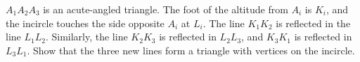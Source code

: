$A_1 A_2 A_3$ is an acute-angled triangle. The foot of the altitude from $A_i$ is $K_i$, and the incircle touches the side opposite $A_i$ at $L_i$. The line $K_1 K_2$ is reflected in the line $L_1 L_2$. Similarly, the line $K_2 K_3$ is reflected in $L_2 L_3$, and $K_3 K_1$ is reflected in $L_3 L_1$. Show that the three new lines form a triangle with vertices on the incircle.
